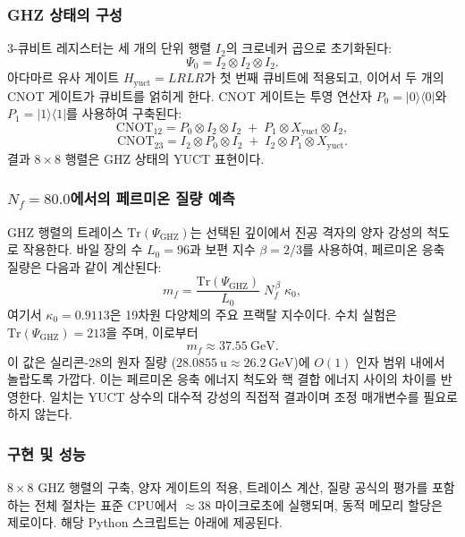 \documentclass[11pt,a4paper]{article}
\begin{document}
	\subsubsection{GHZ 상태의 구성}
	
	3-큐비트 레지스터는 세 개의 단위 행렬 \(I_2\)의 크로네커 곱으로 초기화된다:
	\[
	\Psi_0 = I_2 \otimes I_2 \otimes I_2 .
	\]
	아다마르 유사 게이트 \(H_{\text{yuct}} = LRLR\)가 첫 번째 큐비트에 적용되고, 이어서 두 개의 CNOT 게이트가 큐비트를 얽히게 한다. CNOT 게이트는 투영 연산자 \(P_0 = |0\rangle\langle0|\)와 \(P_1 = |1\rangle\langle1|\)를 사용하여 구축된다:
	\[
	\mathrm{CNOT}_{12} = P_0 \otimes I_2 \otimes I_2 \;+\; P_1 \otimes X_{\text{yuct}} \otimes I_2 ,
	\]
	\[
	\mathrm{CNOT}_{23} = I_2 \otimes P_0 \otimes I_2 \;+\; I_2 \otimes P_1 \otimes X_{\text{yuct}} .
	\]
	결과 \(8\times 8\) 행렬은 GHZ 상태의 YUCT 표현이다.
	
	\subsubsection{\(N_f = 80.0\)에서의 페르미온 질량 예측}
	
	GHZ 행렬의 트레이스 \(\mathrm{Tr}(\Psi_{\mathrm{GHZ}})\)는 선택된 깊이에서 진공 격자의 양자 강성의 척도로 작용한다. 바일 장의 수 \(L_0 = 96\)과 보편 지수 \(\beta = 2/3\)를 사용하여, 페르미온 응축 질량은 다음과 같이 계산된다:
	\[
	m_f = \frac{\mathrm{Tr}(\Psi_{\mathrm{GHZ}})}{L_0} \; N_f^{\,\beta} \;
	\kappa_0 ,
	\]
	여기서 \(\kappa_0 = 0.9113\)은 19차원 다양체의 주요 프랙탈 지수이다. 수치 실험은 \(\mathrm{Tr}(\Psi_{\mathrm{GHZ}}) = 213\)을 주며, 이로부터
	\[
	m_f \approx 37.55\ \mathrm{GeV}.
	\]
	이 값은 실리콘-28의 원자 질량 (\(28.0855\ \mathrm{u} \approx 26.2\ \mathrm{GeV}\))에 \(O(1)\) 인자 범위 내에서 놀랍도록 가깝다. 이는 페르미온 응축 에너지 척도와 핵 결합 에너지 사이의 차이를 반영한다. 일치는 YUCT 상수의 대수적 강성의 직접적 결과이며 조정 매개변수를 필요로 하지 않는다.
	
	\subsubsection{구현 및 성능}
	
	\(8\times 8\) GHZ 행렬의 구축, 양자 게이트의 적용, 트레이스 계산, 질량 공식의 평가를 포함하는 전체 절차는 표준 CPU에서 \(\approx 38\) 마이크로초에 실행되며, 동적 메모리 할당은 제로이다. 해당 Python 스크립트는 아래에 제공된다.
	
\end{document}
